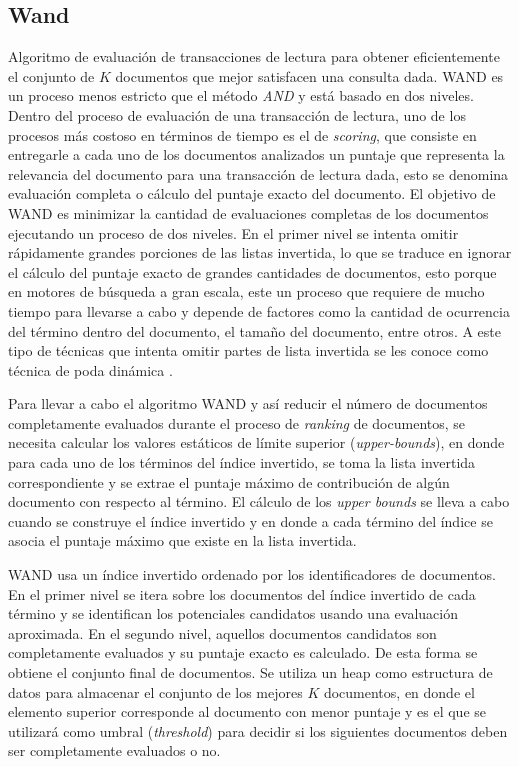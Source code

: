 \subsection{Wand}
\label{marco:wand}
Algoritmo de evaluación de transacciones de lectura para obtener eficientemente el conjunto de $K$ documentos que mejor satisfacen una consulta dada. WAND \citep{Broder:2003} es un proceso menos estricto que el método \textit{AND} y está basado en dos niveles. Dentro del proceso de evaluación de una transacción de lectura, uno de los procesos más costoso en términos de tiempo es el de \textit{scoring}, que consiste en entregarle a cada uno de los documentos analizados un puntaje que representa la relevancia del documento para una transacción de lectura dada, esto se denomina evaluación completa o cálculo del puntaje exacto del documento. El objetivo de WAND es minimizar la cantidad de evaluaciones completas de los documentos ejecutando un proceso de dos niveles. En el primer nivel se intenta omitir rápidamente grandes porciones de las listas invertida, lo que se traduce en ignorar el cálculo del puntaje exacto de grandes cantidades de documentos, esto porque en motores de búsqueda a gran escala, este un proceso que requiere de mucho tiempo para llevarse a cabo y depende de factores como la cantidad de ocurrencia del término dentro del documento, el tamaño del documento, entre otros. A este tipo de técnicas que intenta omitir partes de lista invertida se les conoce como técnica de poda dinámica \citep{Broder:2003, Persin:1994, Turtle:1995}. 

Para llevar a cabo el algoritmo WAND y así reducir el número de documentos completamente evaluados durante el proceso de \textit{ranking} de documentos, se necesita calcular los valores estáticos de límite superior (\textit{upper-bounds}), en donde para cada uno de los términos del índice invertido, se toma la lista invertida correspondiente y se extrae el puntaje máximo de contribución de algún documento con respecto al término. El cálculo de los \textit{upper bounds} se lleva a cabo cuando se construye el índice invertido y en donde a cada término del índice se asocia el puntaje máximo que existe en la lista invertida. 

WAND usa un índice invertido ordenado por los identificadores de documentos. En el primer nivel se itera sobre los documentos del índice invertido de cada término y se identifican los potenciales candidatos usando una evaluación aproximada. En el segundo nivel, aquellos documentos candidatos son completamente evaluados y su puntaje exacto es calculado. De esta forma se obtiene el conjunto final de documentos. Se utiliza un heap como estructura de datos para almacenar el conjunto de los mejores $K$ documentos, en donde el elemento superior corresponde al documento con menor puntaje y es el que se utilizará como umbral (\textit{threshold}) para decidir si los siguientes documentos deben ser completamente evaluados o no.

